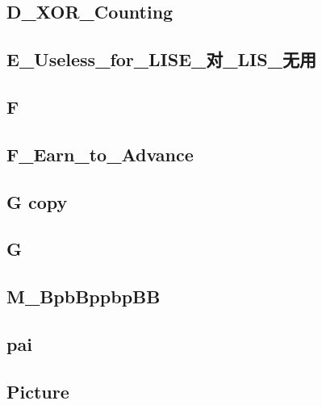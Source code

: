 \subsection{D_XOR_Counting}
\raggedbottom
\hrulefill

\subsection{E_Useless_for_LISE_对_LIS_无用}
\raggedbottom
\hrulefill

\subsection{F}
\raggedbottom
\hrulefill

\subsection{F_Earn_to_Advance}
\raggedbottom
\hrulefill

\subsection{G copy}
\raggedbottom
\hrulefill

\subsection{G}
\raggedbottom
\hrulefill

\subsection{M_BpbBppbpBB}
\raggedbottom
\hrulefill

\subsection{pai}
\raggedbottom
\hrulefill

\subsection{Picture}
\raggedbottom
\hrulefill

